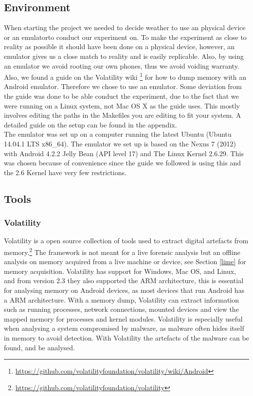 \subsection{Environment}
When starting the project we needed to decide weather to use an physical device 
or an emulatorto conduct our experiment on. To make the experiment as close to 
reality as possible it should have been done on a physical device, however, an 
emulator gives us a close match to reality and is easily replicable. Also, by 
using an emulator we avoid rooting our own phones, thus we avoid voiding 
warranty. Also, we found a guide on the Volatility wiki
\footnote{\url{https://github.com/volatilityfoundation/volatility/wiki/Android}} 
for how to dump memory with an Android emulator. Therefore we chose to use an 
emulator. Some deviation from the guide was done to be able conduct the 
experiment, due to the fact that we were running on a Linux system, not Mac OS 
X as the guide uses. This mostly involves editing the paths in the Makefiles 
you are editing to fit your system. %
A detailed guide on the setup can be found in the appendix.\\

The emulator was set up on a computer running the latest Ubuntu (Ubuntu 14.04.1 LTS x86\_64).
The emulator we set up is based on the Nexus 7 (2012) with Android 4.2.2 Jelly Bean 
(API level 17) and The Linux Kernel 2.6.29. This was chosen because of convenience
since the guide we followed is using this and the 2.6 Kernel have very few restrictions.
\subsection{Tools}
  \subsubsection{Volatility}
  Volatility is a open source collection of tools used to extract digital
  artefacts from memory.\footnote{\url{https://github.com/volatilityfoundation/volatility}} 
  The framework is not meant for a live forensic analysis but an offline analysis
  on memory acquired from a live machine or device, see Section \ref{lime} for
  memory acquisition. Volatility has support for Windows, Mac OS, and Linux, and
  from version 2.3 they also supported the ARM architecture, this is essential
  for analysing memory on Android devices, as most devices that run Android has a
  ARM architecture. With a memory dump, Volatility can extract information such as
  running processes, network connections, mounted devices and view the mapped
  memory for processes and kernel modules. Volatility is especially useful when
  analysing a system compromised by malware, as malware often hides itself in
  memory to avoid detection. With Volatility the artefacts of the malware can be
  found, and be analysed. \\
  
